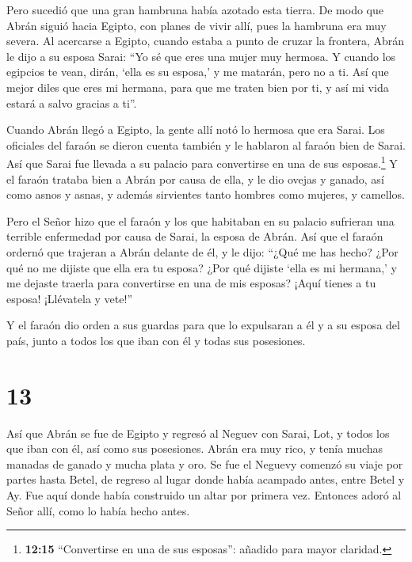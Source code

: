  Pero sucedió que una gran hambruna había azotado esta
tierra. De modo que Abrán siguió hacia Egipto, con planes de vivir allí,
pues la hambruna era muy severa.  Al acercarse a Egipto,
cuando estaba a punto de cruzar la frontera, Abrán le dijo a su esposa
Sarai: ``Yo sé que eres una mujer muy hermosa.  Y cuando
los egipcios te vean, dirán, `ella es su esposa,' y me matarán, pero no
a ti.  Así que mejor diles que eres mi hermana, para que me
traten bien por ti, y así mi vida estará a salvo gracias a ti''.

 Cuando Abrán llegó a Egipto, la gente allí notó lo hermosa
que era Sarai.  Los oficiales del faraón se dieron cuenta
también y le hablaron al faraón bien de Sarai. Así que Sarai fue llevada
a su palacio para convertirse en una de sus esposas.\footnote{\textbf{12:15}
  ``Convertirse en una de sus esposas'': añadido para mayor claridad.}
 Y el faraón trataba bien a Abrán por causa de ella, y le
dio ovejas y ganado, así como asnos y asnas, y además sirvientes tanto
hombres como mujeres, y camellos.

 Pero el Señor hizo que el faraón y los que habitaban en su
palacio sufrieran una terrible enfermedad por causa de Sarai, la esposa
de Abrán.  Así que el faraón ordernó que trajeran a Abrán
delante de él, y le dijo: ``¿Qué me has hecho? ¿Por qué no me dijiste
que ella era tu esposa?  ¿Por qué dijiste `ella es mi
hermana,' y me dejaste traerla para convertirse en una de mis esposas?
¡Aquí tienes a tu esposa! ¡Llévatela y vete!''

 Y el faraón dio orden a sus guardas para que lo expulsaran
a él y a su esposa del país, junto a todos los que iban con él y todas
sus posesiones.

\hypertarget{section-12}{%
\section{13}\label{section-12}}

 Así que Abrán se fue de Egipto y regresó al Neguev con
Sarai, Lot, y todos los que iban con él, así como sus posesiones.
 Abrán era muy rico, y tenía muchas manadas de ganado y
mucha plata y oro.  Se fue el Neguevy comenzó su viaje por
partes hasta Betel, de regreso al lugar donde había acampado antes,
entre Betel y Ay.  Fue aquí donde había construido un altar
por primera vez. Entonces adoró al Señor allí, como lo había hecho
antes.


